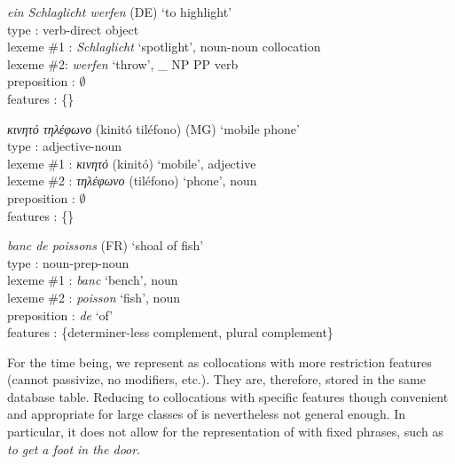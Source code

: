\documentclass[output=paper]{langsci/langscibook}
\begin{document}
\begin{exe}
  \ex\label{fou:lex1}
           {\em ein Schlaglicht werfen } (DE) `to highlight' \\
           type : verb-direct object \\
           lexeme \#1 : {\em Schlaglicht} `spotlight', noun-noun collocation\\
           lexeme  \#2: {\em werfen} `throw', \_ NP PP verb\\
           preposition : $\emptyset$ \\
           features : \{\}
  



  \ex\label{fou:lex2}
           {\em  κινητό τηλέφωνο} (kinitó tiléfono) (MG) `mobile phone' \\
           type : adjective-noun \\
           lexeme  \#1 : {\em κινητό} (kinitó) `mobile', adjective\\
           lexeme  \#2 : {\em τηλέφωνο} (tiléfono) `phone', noun \\
           preposition : $\emptyset$ \\
           features : \{\}
  


  \ex\label{fou:lex3}
           {\em banc de poissons} (FR) `shoal of fish' \\
           type : noun-prep-noun \\
           lexeme  \#1 : {\em banc} `bench', noun \\
           lexeme  \#2 : {\em poisson} `fish', noun \\
           preposition :  {\em de} `of'\\
           features : \{determiner-less complement, plural complement\}
\end{exe}           


For the time being, we represent  as collocations with more restriction features (cannot passivize, no modifiers, etc.). They are, therefore, stored in the same database table. Reducing  to collocations with specific features though convenient and appropriate for large classes of  is nevertheless not general enough. In particular, it does not allow for the representation of  with fixed phrases, such as \textit{to get a foot in the door}. 
\end{document}
